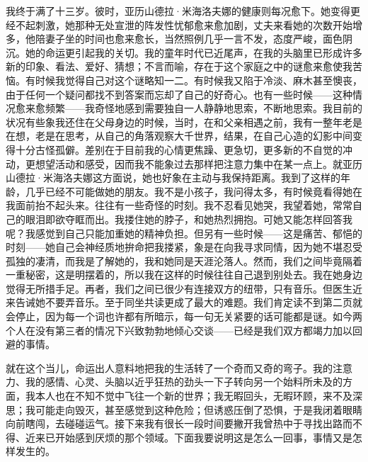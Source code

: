 \documentclass[12pt, UTF8]{ctexbook}
\begin{document}
\par 我终于满了十三岁。彼时，亚历山德拉·米海洛夫娜的健康则每况愈下。她变得更经不起刺激，她那种无处宣泄的阵发性忧郁愈来愈加剧，丈夫来看她的次数开始增多，他陪妻子坐的时间也愈来愈长，当然照例几乎一言不发，态度严峻，面色阴沉。她的命运更引起我的关切。我的童年时代已近尾声，在我的头脑里已形成许多新的印象、看法、爱好、猜想；不言而喻，存在于这个家庭之中的谜愈来愈使我苦恼。有时候我觉得自己对这个谜略知一二。有时候我又陷于冷淡、麻木甚至懊丧，由于任何一个疑问都找不到答案而忘却了自己的好奇心。也有一些时候——这种情况愈来愈频繁——我奇怪地感到需要独自一人静静地思索，不断地思索。我目前的状况有些象我还住在父母身边的时候，当时，在和父亲相遇之前，我有一整年老是在想，老是在思考，从自己的角落观察大千世界，结果，在自己心造的幻影中间变得十分古怪孤僻。差别在于目前我的心情更焦躁、更急切，更多新的不自觉的冲动，更想望活动和感受，因而我不能象过去那样把注意力集中在某一点上。就亚历山德拉·米海洛夫娜这方面说，她也好象在主动与我保持距离。我到了这样的年龄，几乎已经不可能做她的朋友。我不是小孩子，我问得太多，有时候竟看得她在我面前抬不起头来。往往有一些奇怪的时刻。我不忍看见她哭，我望着她，常常自己的眼泪即欲夺眶而出。我搂住她的脖子，和她热烈拥抱。可她又能怎样回答我呢？我感觉到自己只能加重她的精神负担。但另有一些时候——这是痛苦、郁悒的时刻——她自己会神经质地拚命把我搂紧，象是在向我寻求同情，因为她不堪忍受孤独的凄清，而我是了解她的，我和她同是天涯沦落人。然而，我们之间毕竟隔着一重秘密，这是明摆着的，所以我在这样的时候往往自己退到别处去。我在她身边觉得无所措手足。再者，我们之间已很少有连接双方的纽带，只有音乐。但医生近来告诫她不要弄音乐。至于同坐共读更成了最大的难题。我们肯定读不到第二页就会停止，因为每一个词也许都有所暗示，每一句无关紧要的话可能都是谜。如今两个人在没有第三者的情况下兴致勃勃地倾心交谈——已经是我们双方都竭力加以回避的事情。
\par 就在这个当儿，命运出人意料地把我的生活转了一个奇而又奇的弯子。我的注意力、我的感情、心灵、头脑以近乎狂热的劲头一下子转向另一个始料所未及的方面，我本人也在不知不觉中飞往一个新的世界；我无暇回头，无暇环顾，来不及深思；我可能走向毁灭，甚至感觉到这种危险；但诱惑压倒了恐惧，于是我闭着眼睛向前瞎闯，去碰碰运气。接下来我有很长一段时间要撇开我曾热中于寻找出路而不得、近来已开始感到厌烦的那个领域。下面我要说明这是怎么一回事，事情又是怎样发生的。
\end{document}
